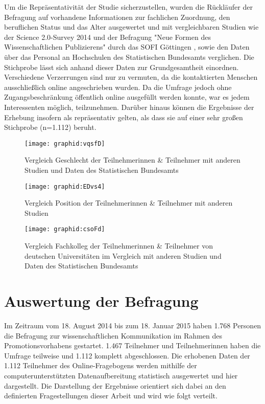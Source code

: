 Um die Repräsentativität der Studie sicherzustellen, wurden die Rückläufer der Befragung auf vorhandene Informationen zur fachlichen Zuordnung, den beruflichen Status und das Alter ausgewertet und mit vergleichbaren Studien wie der Science 2.0-Survey 2014 \cite{Pscheida_2015} und der Befragung "Neue Formen des Wissenschaftlichen Publizierens" durch das SOFI Göttingen \cite{Hanekop_2008}, sowie den Daten über das Personal an Hochschulen des Statistischen Bundesamts \cite{Destatis_2014} verglichen. Die Stichprobe lässt sich anhand dieser Daten zur Grundgesamtheit einordnen. Verschiedene Verzerrungen sind nur zu vermuten, da die kontaktierten Menschen ausschließlich online angeschrieben wurden. Da die Umfrage jedoch ohne Zugangsbeschränkung öffentlich online ausgefüllt werden konnte, war es jedem Interessenten möglich, teilzunehmen. Darüber hinaus können die Ergebnisse der Erhebung insofern als repräsentativ gelten, als dass sie auf  einer sehr großen Stichprobe (n=1.112) beruht.

\begin{figure}[h!]
\texttt{[image: graphid:vqsfD]}
\caption{Vergleich Geschlecht der Teilnehmerinnen & Teilnehmer mit anderen Studien und Daten des Statistischen Bundesamts}
\end{figure}

\begin{figure}[h!]
\texttt{[image: graphid:EDvs4]}
\caption{Vergleich Position der Teilnehmerinnen & Teilnehmer mit anderen Studien}
\end{figure}

\begin{figure}[h!]
\texttt{[image: graphid:csoFd]}
\caption{Vergleich Fachkolleg der Teilnehmerinnen & Teilnehmer von deutschen Universitäten im Vergleich mit anderen Studien und Daten des Statistischen Bundesamts}
\end{figure}

\section{Auswertung der Befragung}

Im Zeitraum vom 18. August 2014 bis zum 18. Januar 2015 haben 1.768 Personen die Befragung zur wissenschaftlichen Kommunikation im Rahmen des Promotionsvorhabens gestartet. 1.467 Teilnehmer und Teilnehmerinnen haben die Umfrage teilweise und 1.112 komplett abgeschlossen. Die erhobenen Daten der 1.112 Teilnehmer des Online-Fragebogens werden mithilfe der computerunterstützten Datenaufbereitung statistisch ausgewertet und hier dargestellt. Die Darstellung der Ergebnisse orientiert sich dabei an den definierten Fragestellungen dieser Arbeit und wird wie folgt verteilt.

